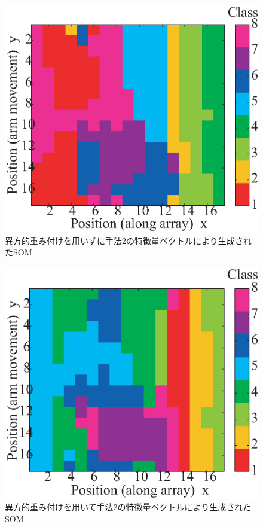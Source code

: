 ﻿\documentclass[12pt,oneside]{jsbook}
\begin{document}
\begin{figure}[btp]
\includegraphics[width =\hsize ]{SOM_170131_wow_wh5_d6.eps}
\caption{異方的重み付けを用いずに手法2の特徴量ベクトルにより生成されたSOM}
\label{vector2-som-wow}
\end{figure}

\begin{figure}[btp]
\includegraphics[width =\hsize ]{SOM_170131_wh5_d6.eps}
\caption{異方的重み付けを用いて手法2の特徴量ベクトルにより生成されたSOM}
\label{vector2-som}
\end{figure}
\end{document}
